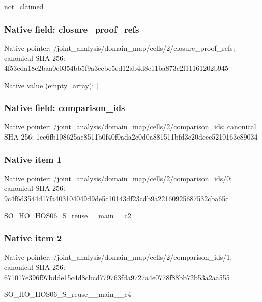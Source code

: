 \documentclass[10pt,a4paper]{article}
\begin{document}
\begingroup\raggedright\sloppy not\_\allowbreak{}claimed\par\endgroup

\subsubsection{Native field: closure\_\allowbreak{}proof\_\allowbreak{}refs}
Native pointer: /joint\_\allowbreak{}analysis/domain\_\allowbreak{}map/cells/2/closure\_\allowbreak{}proof\_\allowbreak{}refs; canonical SHA-256: 4f53cda18c2baa0c0354bb5f9a3ecbe5ed12ab4d8e11ba873c2f11161202b945

Native value (empty\_\allowbreak{}array): []

\subsubsection{Native field: comparison\_\allowbreak{}ids}
Native pointer: /joint\_\allowbreak{}analysis/domain\_\allowbreak{}map/cells/2/comparison\_\allowbreak{}ids; canonical SHA-256: 1ee6fb108625ae8511b0f40f0ada2c0d0a881511bfd3e20dcee5210163e89034

\subsubsection{Native item 1}
Native pointer: /joint\_\allowbreak{}analysis/domain\_\allowbreak{}map/cells/2/comparison\_\allowbreak{}ids/0; canonical SHA-256: 9c4f6d3544d17fa403104049d9de5c10143df23cdb9a22160925687532cba65c

\begingroup\raggedright\sloppy SO\_\allowbreak{}HO\_\allowbreak{}HOS06\_\allowbreak{}S\_\allowbreak{}reuse\_\allowbreak{}\_\allowbreak{}main\_\allowbreak{}\_\allowbreak{}c2\par\endgroup

\subsubsection{Native item 2}
Native pointer: /joint\_\allowbreak{}analysis/domain\_\allowbreak{}map/cells/2/comparison\_\allowbreak{}ids/1; canonical SHA-256: 671017e396f97bdde15c4d8cbcd779763fda9727a4e0778f88bb72b53a2aa555

\begingroup\raggedright\sloppy SO\_\allowbreak{}HO\_\allowbreak{}HOS06\_\allowbreak{}S\_\allowbreak{}reuse\_\allowbreak{}\_\allowbreak{}main\_\allowbreak{}\_\allowbreak{}c4\par\endgroup
\end{document}
